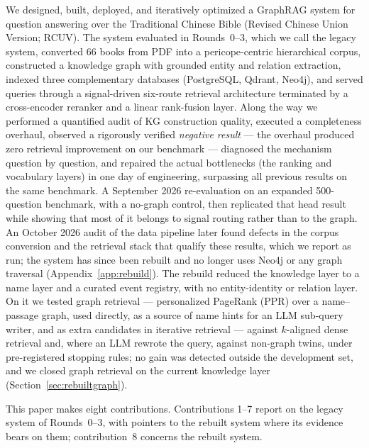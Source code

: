 We designed, built, deployed, and iteratively optimized a GraphRAG system
for question answering over the Traditional Chinese Bible (Revised Chinese
Union Version; RCUV). The system evaluated in Rounds~0--3, which we call
the legacy system, converted 66 books from PDF into a pericope-centric
hierarchical corpus, constructed a knowledge graph with grounded entity
and relation extraction, indexed three complementary databases
(PostgreSQL, Qdrant, Neo4j), and served queries through a signal-driven
six-route retrieval architecture terminated by a cross-encoder reranker
and a linear rank-fusion layer. Along the way we
performed a quantified audit of KG construction quality, executed a
completeness overhaul, observed a rigorously verified \emph{negative
result} --- the overhaul produced zero retrieval improvement on our
benchmark --- diagnosed the mechanism question by question, and repaired
the actual bottlenecks (the ranking and vocabulary layers) in one day
of engineering, surpassing all previous results on the same benchmark. A
September 2026
re-evaluation on an expanded 500-question benchmark, with a no-graph
control, then replicated that head result while showing that most of it
belongs to signal routing rather than to the graph. An October 2026 audit
of the data pipeline later found defects in the corpus conversion and the
retrieval stack that qualify these results, which we report as run; the
system has since been rebuilt and no longer uses Neo4j or any graph
traversal (Appendix~\ref{app:rebuild}). The rebuild reduced the knowledge layer to
a name layer and a curated event registry, with no entity-identity or
relation layer. On it we tested graph retrieval --- personalized PageRank
(PPR) over a name--passage graph, used directly, as a source of name
hints for an LLM sub-query writer, and as extra candidates in iterative
retrieval --- against $k$-aligned dense retrieval
and, where an LLM rewrote the query, against non-graph twins, under pre-registered stopping rules; no gain was detected outside the development set, and we closed graph retrieval on the current knowledge
layer (Section~\ref{sec:rebuiltgraph}).

This paper makes eight contributions. Contributions 1--7 report on the
legacy system of Rounds~0--3, with pointers to the rebuilt system where
its evidence bears on them; contribution~8 concerns the rebuilt system.

